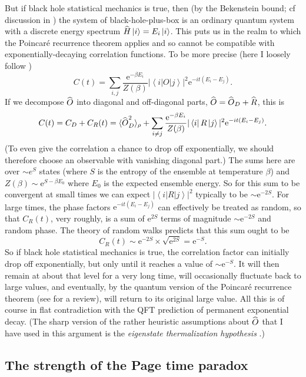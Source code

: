 \documentclass[12pt]{article}
\newcommand{\ket}[1]{\ensuremath{\left|  #1 \right\rangle}}
\newcommand{\bra}[1]{\ensuremath{\left\langle #1 \right|}}
\newcommand{\matel}[3]{\ensuremath{\bra{#1} #2 \ket{#3}}}
\newcommand{\op}[1]{\ensuremath{\widehat{\textsf{\ensuremath{#1}}}}}
\newcommand{\be}{\begin{equation}}
\newcommand{\ee}{\end{equation}}
\newcommand{\e}[1]{\mathrm{e}^{#1}}
\begin{document}
But if black hole statistical mechanics is true, then (by the Bekenstein bound; cf discussion in ) the system of black-hole-plus-box is an ordinary quantum system with a discrete energy spectrum $\op{H}\ket{i}=E_i\ket{i}$. This puts us in the realm to which the Poincar\'{e} recurrence theorem applies and so cannot be compatible with exponentially-decaying correlation functions. To be more precise (here I loosely follow ) 
\be 
C(t)=\sum_{i,j}  \frac{\e{-\beta E_i}}{Z(\beta)}|\matel{i}{O}{j}|^2 \e{-it(E_i-E_j)}.
\ee
If we decompose $\op{O}$ into diagonal and off-diagonal parts, $\op{O}=\op{O}_D + \op{R}$, this is
\be \label{correlation}
C(t) = C_D + C_R(t)= \langle \op{O}_D^2 \rangle_\rho + \sum_{i\neq j}\frac{\e{-\beta E_i}}{Z(\beta)}|\matel{i}{R}{j}|^2 \e{-it(E_i-E_j)}.
\ee
(To even give the correlation a chance to drop off exponentially, we should therefore choose an observable with vanishing diagonal part.)
The sums here are over $\sim e^S$ states (where $S$ is the entropy of the ensemble at temperature $\beta$) and $Z(\beta)\sim \e{S-\beta E_0}$ where $E_0$ is the expected ensemble energy. So for this sum to be convergent at small times we can expect $|\matel{i}{R}{j}|^2$ typically to be $\sim \e{-2S}$. For large times, the phase factors $\e{-it(E_i-E_j)}$ can effectively be treated as random, so that $C_R(t)$, very roughly, is a sum of $\e{2S}$ terms of magnitude $\sim \e{-2S}$ and random phase. The theory of random walks predicts that this sum ought to be
\be
C_R(t) \sim \e{-2S} \times \sqrt{\e{2S}} = \e{-S}.
\ee
So if black hole statistical mechanics is true, the correlation factor can initially drop off exponentially, but only until it reaches a value of $\sim\e{-S}$. It will then remain at about that level for a very long time, will occasionally fluctuate back to large values, and eventually, by the quantum version of the Poincar\'{e} recurrence theorem (see  for a review), will return to its original large value. All this is of course in flat contradiction with the QFT prediction of permanent exponential decay. (The sharp version of the rather heuristic assumptions about $\op{O}$ that I have used in this argument is the \emph{eigenstate thermalization hypothesis} \cite{srednicki-thermalisation}.)



\subsection{The strength of the Page time paradox}
\end{document}
